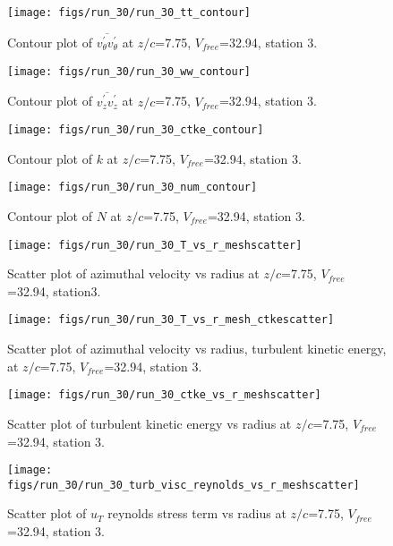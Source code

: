 \begin{figure}[H]
\centering
\texttt{[image: figs/run\_30/run\_30\_tt\_contour]}
\caption{Contour plot of $\overline{v_{\theta}^{\prime} v_{\theta}^{\prime}}$ at $z/c$=7.75, $V_{free}$=32.94, station 3.}
\end{figure}


\begin{figure}[H]
\centering
\texttt{[image: figs/run\_30/run\_30\_ww\_contour]}
\caption{Contour plot of $\overline{v_{z}^{\prime} v_{z}^{\prime}}$ at $z/c$=7.75, $V_{free}$=32.94, station 3.}
\end{figure}


\begin{figure}[H]
\centering
\texttt{[image: figs/run\_30/run\_30\_ctke\_contour]}
\caption{Contour plot of $k$ at $z/c$=7.75, $V_{free}$=32.94, station 3.}
\end{figure}


\begin{figure}[H]
\centering
\texttt{[image: figs/run\_30/run\_30\_num\_contour]}
\caption{Contour plot of $N$ at $z/c$=7.75, $V_{free}$=32.94, station 3.}
\end{figure}


\begin{figure}[H]
\centering
\texttt{[image: figs/run\_30/run\_30\_T\_vs\_r\_meshscatter]}
\caption{Scatter plot of azimuthal velocity vs radius at $z/c$=7.75, $V_{free}$=32.94, station3.}
\end{figure}


\begin{figure}[H]
\centering
\texttt{[image: figs/run\_30/run\_30\_T\_vs\_r\_mesh\_ctkescatter]}
\caption{Scatter plot of azimuthal velocity vs radius, turbulent kinetic energy, at $z/c$=7.75, $V_{free}$=32.94, station 3.}
\end{figure}


\begin{figure}[H]
\centering
\texttt{[image: figs/run\_30/run\_30\_ctke\_vs\_r\_meshscatter]}
\caption{Scatter plot of turbulent kinetic energy vs radius at $z/c$=7.75, $V_{free}$=32.94, station 3.}
\end{figure}


\begin{figure}[H]
\centering
\texttt{[image: figs/run\_30/run\_30\_turb\_visc\_reynolds\_vs\_r\_meshscatter]}
\caption{Scatter plot of $
u_T$ reynolds stress term vs radius at $z/c$=7.75, $V_{free}$=32.94, station 3.}
\end{figure}


